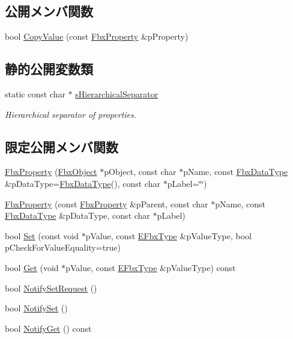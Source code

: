 \subsection*{公開メンバ関数}
\begin{DoxyCompactItemize}
\item 
bool \hyperlink{class_fbx_property_aadee6392924e168e7cfea5225148893a}{Copy\+Value} (const \hyperlink{class_fbx_property}{Fbx\+Property} \&p\+Property)
\end{DoxyCompactItemize}
\subsection*{静的公開変数類}
\begin{DoxyCompactItemize}
\item 
static const char $\ast$ \hyperlink{class_fbx_property_a4b55a5fb0b5e63c3db166e64f38bec1d}{s\+Hierarchical\+Separator}
\begin{DoxyCompactList}\small\item\em Hierarchical separator of properties. \end{DoxyCompactList}\end{DoxyCompactItemize}
\subsection*{限定公開メンバ関数}
\begin{DoxyCompactItemize}
\item 
\hyperlink{class_fbx_property_aa9bd3c13031aeb1035adfb3e37256ce4}{Fbx\+Property} (\hyperlink{class_fbx_object}{Fbx\+Object} $\ast$p\+Object, const char $\ast$p\+Name, const \hyperlink{class_fbx_data_type}{Fbx\+Data\+Type} \&p\+Data\+Type=\hyperlink{class_fbx_data_type}{Fbx\+Data\+Type}(), const char $\ast$p\+Label=\char`\"{}\char`\"{})
\item 
\hyperlink{class_fbx_property_a019739c19f5652349afb9780945e57f0}{Fbx\+Property} (const \hyperlink{class_fbx_property}{Fbx\+Property} \&p\+Parent, const char $\ast$p\+Name, const \hyperlink{class_fbx_data_type}{Fbx\+Data\+Type} \&p\+Data\+Type, const char $\ast$p\+Label)
\item 
bool \hyperlink{class_fbx_property_aa89d91b8bf335921748ea21ab08eb9a3}{Set} (const void $\ast$p\+Value, const \hyperlink{fbxpropertytypes_8h_a73913a5ddfb20e57c6f25e9e6784bd92}{E\+Fbx\+Type} \&p\+Value\+Type, bool p\+Check\+For\+Value\+Equality=true)
\item 
bool \hyperlink{class_fbx_property_ac2b8fdea0758676644547365cea1e2ae}{Get} (void $\ast$p\+Value, const \hyperlink{fbxpropertytypes_8h_a73913a5ddfb20e57c6f25e9e6784bd92}{E\+Fbx\+Type} \&p\+Value\+Type) const
\item 
bool \hyperlink{class_fbx_property_afb12acf8aeec609f4df77c61e5346e59}{Notify\+Set\+Request} ()
\item 
bool \hyperlink{class_fbx_property_ac2a6a7d8711567294c90f37791846331}{Notify\+Set} ()
\item 
bool \hyperlink{class_fbx_property_abbb2f1f50f22fbcd94ad56e3373efaac}{Notify\+Get} () const
\end{DoxyCompactItemize}
